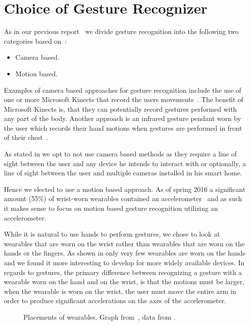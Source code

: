 \section{Choice of Gesture Recognizer}
\label{sec:analysis:choice-of-gesture-recognizer}

As in our previous report~\cite[p. 19]{prespecialisation} we divide gesture recognition into the following two categories based on~\cite{Kela2006}:

\begin{itemize}
\item Camera based.
\item Motion based.
\end{itemize}

Examples of camera based approaches for gesture recognition include the use of one or more Microsoft Kinects that record the users movements~\cite{caon2011context}. The benefit of Microsoft Kinects is, that they can potentially record gestures performed with any part of the body. Another approach is an infrared gesture pendant worn by the user which records their hand motions when gestures are performed in front of their chest~\cite{starner2000gesture}.

As stated in  we opt to not use camera based methods as they require a line of sight between the user and any device he intends to interact with or optionally, a line of sight between the user and multiple cameras installed in his smart home.

Hence we elected to use a motion based approach. As of spring 2016 a significant amount (55\%) of wrist-worn wearables contained an accelerometer~\cite[pp. 2-3]{prespecialisation} and as such it makes sense to focus on motion based gesture recognition utilizing an accelerometer.

While it is natural to use hands to perform gestures, we chose to look at wearables that are worn on the wrist rather than wearables that are worn on the hands or the fingers. As shown in  only very few wearables are worn on the hands and we found it more interesting to develop for more widely available devices. In regards to gestures, the primary difference between recognizing a gesture with a wearable worn on the hand and on the wrist, is that the motions must be larger, when the wearable is worn on the wrist, \ie the user must move the entire arm in order to produce significant accelerations on the axes of the accelerometer.

\begin{figure}[!htb]
  \centering
  
  \caption{Placements of wearables. Graph from~\cite[p. 2]{prespecialisation}, data from \protect\cite{LISTOFWEARABLES}.}
\label{fig:wearables-placement}
\end{figure}

